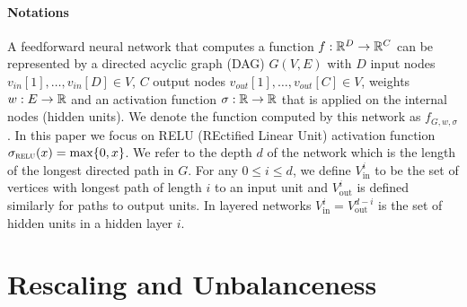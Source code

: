 \documentclass[11pt]{article}
\newcommand{\IN}{\text{in}}
\newcommand{\OUT}{\text{out}}
\newcommand{\vin}{v_{in}}
\newcommand{\vout}{v_{out}}
\newcommand{\relu}{\sigma_{\textsc{relu}}}
\begin{document}
\paragraph{Notations} A feedforward neural network that computes a
function $f:\mathbb{R}^D \rightarrow \mathbb{R}^C$ can be represented by a directed
acyclic graph (DAG) $G(V,E)$ with $D$ input nodes
$\vin[1],\dots,\vin[D]\in V$, $C$ output nodes $\vout[1],\dots,
\vout[C]\in V$, weights $w:E\rightarrow \mathbb{R}$ and an activation function
$\sigma:\mathbb{R}\rightarrow\mathbb{R}$ that is applied on the internal nodes (hidden
units). We denote the function computed by this network as
$f_{G,w,\sigma}$. In this paper we focus on RELU (REctified Linear
Unit) activation function $\relu(x) = \max\{0,x\}$. We refer to the
depth $d$ of the network which is the length of the longest directed
path in $G$.  For any $0\leq i \leq d$, we define $V^i_{\IN}$ to be
the set of vertices with longest path of length $i$ to an input unit
and $V^{i}_{\OUT}$ is defined similarly for paths to output units. In
layered networks $V^i_{\IN} = V^{d-i}_{\OUT}$ is the set of hidden
units in a hidden layer $i$.

\section{Rescaling and Unbalanceness}
\end{document}
